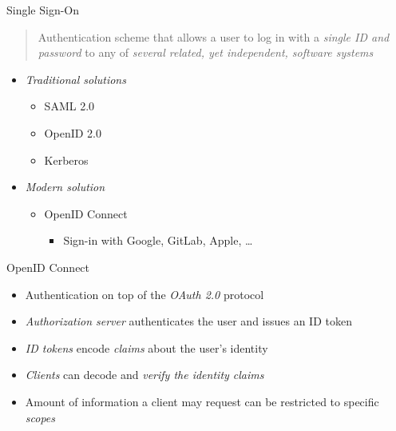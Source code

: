 \documentclass[aspectratio=169]{beamer}
\begin{document}
\begin{frame}{Single Sign-On}
	\begin{quotation}
		\hspace{-\parindent}Authentication scheme that allows a user to log in with a \emph{single ID and password} to any of \emph{several related, yet independent, software systems} 
	\end{quotation}

	\vspace*{1.5em}
	\pause

	\begin{itemize}
		\item \emph{Traditional solutions}
		\begin{itemize}
			\item SAML 2.0 \cite{saml-2} \hfill {}
			\item OpenID 2.0 \cite{openid-auth-2}
			\item Kerberos \cite{kerberos}
		\end{itemize}
		\pause
		\item \emph{Modern solution}
		\begin{itemize}
			\item OpenID Connect \cite{oidc-core}
			\begin{itemize}
				\item Sign-in with Google, GitLab, Apple, \dots
			\end{itemize}
		\end{itemize}
	\end{itemize}
\end{frame}

\begin{frame}{OpenID Connect}
	\begin{itemize}
		\item Authentication on top of the \emph{OAuth 2.0}  protocol \hfill {}
		\pause
		\item \emph{Authorization server} authenticates the user and issues an ID token
		\item \emph{ID tokens} encode \emph{claims} about the user's identity
		\pause
		\item \emph{Clients} can decode and \emph{verify the identity claims}
		\item Amount of information a client may request can be restricted to specific \emph{scopes}
	\end{itemize}
\end{frame}
\end{document}

